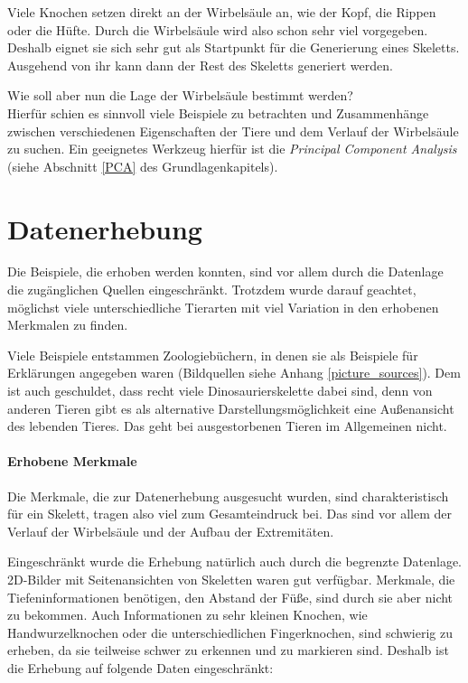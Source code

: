 Viele Knochen setzen direkt an der Wirbelsäule an, wie \zb der Kopf, die Rippen oder die Hüfte. Durch die Wirbelsäule wird also schon sehr viel vorgegeben.
Deshalb eignet sie sich sehr gut als Startpunkt für die Generierung eines Skeletts. Ausgehend von ihr kann dann der Rest des Skeletts generiert werden.

Wie soll aber nun die Lage der Wirbelsäule bestimmt werden?\\
Hierfür schien es sinnvoll viele Beispiele zu betrachten und Zusammenhänge zwischen verschiedenen Eigenschaften der Tiere und dem Verlauf der Wirbelsäule zu suchen.
Ein geeignetes Werkzeug hierfür ist die \emph{Principal Component Analysis} (siehe Abschnitt \ref{PCA} des Grundlagenkapitels).
 
 
 \section{Datenerhebung}
 \label{pca_input_data}
 
 Die Beispiele, die erhoben werden konnten, sind vor allem durch die Datenlage \bzw die zugänglichen Quellen eingeschränkt. Trotzdem wurde darauf geachtet, möglichst viele unterschiedliche Tierarten mit viel Variation in den erhobenen Merkmalen zu finden.
 
 Viele Beispiele entstammen Zoologiebüchern, in denen sie als Beispiele für Erklärungen angegeben waren (Bildquellen siehe Anhang \ref{picture_sources}). Dem ist auch geschuldet, dass recht viele Dinosaurierskelette dabei sind, denn von anderen Tieren gibt es als alternative Darstellungsmöglichkeit eine Außenansicht des lebenden Tieres. Das geht bei ausgestorbenen Tieren im Allgemeinen nicht.
 
 \paragraph{Erhobene Merkmale}
 Die Merkmale, die zur Datenerhebung ausgesucht wurden, sind charakteristisch für ein Skelett, tragen also viel zum Gesamteindruck bei. Das sind vor allem der Verlauf der Wirbelsäule und der Aufbau der Extremitäten.

 Eingeschränkt wurde die Erhebung natürlich auch durch die begrenzte Datenlage. 2D-Bilder mit Seitenansichten von Skeletten waren gut verfügbar. Merkmale, die Tiefeninformationen benötigen, \zb den Abstand der Füße, sind durch sie aber nicht zu bekommen. Auch Informationen zu sehr kleinen Knochen, wie Handwurzelknochen oder die unterschiedlichen Fingerknochen, sind schwierig zu erheben, da sie teilweise schwer zu erkennen und zu markieren sind. 
 Deshalb ist die Erhebung auf folgende Daten eingeschränkt:
  
